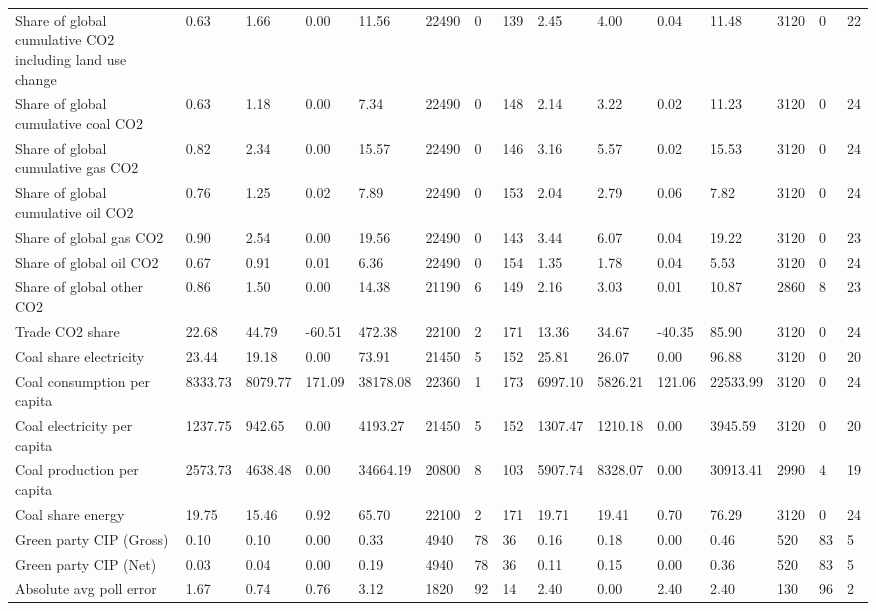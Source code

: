 \begin{longtable}{lllllllllllllll}
Share of global cumulative CO2 including land use change & 0.63 & 1.66 & 0.00 & 11.56 & 22490 & 0 & 139 & 2.45 & 4.00 & 0.04 & 11.48 & 3120 & 0 & 22\\
Share of global cumulative coal CO2 & 0.63 & 1.18 & 0.00 & 7.34 & 22490 & 0 & 148 & 2.14 & 3.22 & 0.02 & 11.23 & 3120 & 0 & 24\\
Share of global cumulative gas CO2 & 0.82 & 2.34 & 0.00 & 15.57 & 22490 & 0 & 146 & 3.16 & 5.57 & 0.02 & 15.53 & 3120 & 0 & 24\\
\addlinespace
Share of global cumulative oil CO2 & 0.76 & 1.25 & 0.02 & 7.89 & 22490 & 0 & 153 & 2.04 & 2.79 & 0.06 & 7.82 & 3120 & 0 & 24\\
Share of global gas CO2 & 0.90 & 2.54 & 0.00 & 19.56 & 22490 & 0 & 143 & 3.44 & 6.07 & 0.04 & 19.22 & 3120 & 0 & 23\\
Share of global oil CO2 & 0.67 & 0.91 & 0.01 & 6.36 & 22490 & 0 & 154 & 1.35 & 1.78 & 0.04 & 5.53 & 3120 & 0 & 24\\
Share of global other CO2 & 0.86 & 1.50 & 0.00 & 14.38 & 21190 & 6 & 149 & 2.16 & 3.03 & 0.01 & 10.87 & 2860 & 8 & 23\\
Trade CO2 share & 22.68 & 44.79 & -60.51 & 472.38 & 22100 & 2 & 171 & 13.36 & 34.67 & -40.35 & 85.90 & 3120 & 0 & 24\\
\addlinespace
Coal share electricity & 23.44 & 19.18 & 0.00 & 73.91 & 21450 & 5 & 152 & 25.81 & 26.07 & 0.00 & 96.88 & 3120 & 0 & 20\\
Coal consumption per capita & 8333.73 & 8079.77 & 171.09 & 38178.08 & 22360 & 1 & 173 & 6997.10 & 5826.21 & 121.06 & 22533.99 & 3120 & 0 & 24\\
Coal electricity per capita & 1237.75 & 942.65 & 0.00 & 4193.27 & 21450 & 5 & 152 & 1307.47 & 1210.18 & 0.00 & 3945.59 & 3120 & 0 & 20\\
Coal production per capita & 2573.73 & 4638.48 & 0.00 & 34664.19 & 20800 & 8 & 103 & 5907.74 & 8328.07 & 0.00 & 30913.41 & 2990 & 4 & 19\\
Coal share energy & 19.75 & 15.46 & 0.92 & 65.70 & 22100 & 2 & 171 & 19.71 & 19.41 & 0.70 & 76.29 & 3120 & 0 & 24\\
\addlinespace
Green party CIP (Gross) & 0.10 & 0.10 & 0.00 & 0.33 & 4940 & 78 & 36 & 0.16 & 0.18 & 0.00 & 0.46 & 520 & 83 & 5\\
Green party CIP (Net) & 0.03 & 0.04 & 0.00 & 0.19 & 4940 & 78 & 36 & 0.11 & 0.15 & 0.00 & 0.36 & 520 & 83 & 5\\
Absolute avg poll error & 1.67 & 0.74 & 0.76 & 3.12 & 1820 & 92 & 14 & 2.40 & 0.00 & 2.40 & 2.40 & 130 & 96 & 2\\

\end{longtable}

